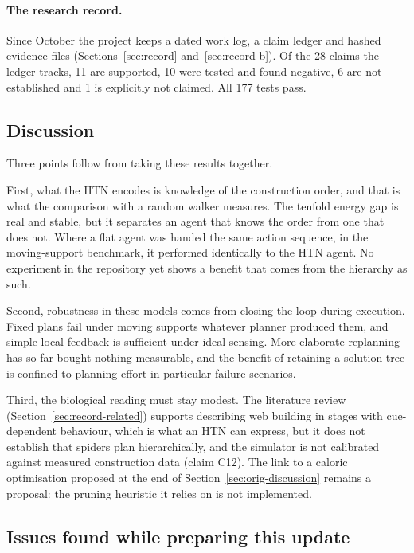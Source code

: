 \paragraph{The research record.}
Since October the project keeps a dated work log, a claim ledger and hashed evidence files
(Sections~\ref{sec:record} and~\ref{sec:record-b}). Of the 28 claims the ledger tracks, 11 are supported, 10
were tested and found negative, 6 are not established and 1 is explicitly not claimed. All 177 tests pass.

\subsection{Discussion}
\label{sec:synthesis-discussion}

Three points follow from taking these results together.

First, what the HTN encodes is knowledge of the construction order, and that is what the comparison with a
random walker measures. The tenfold energy gap is real and stable, but it separates an agent that knows the
order from one that does not. Where a flat agent was handed the same action sequence, in the moving-support
benchmark, it performed identically to the HTN agent. No experiment in the repository yet shows a benefit
that comes from the hierarchy as such.

Second, robustness in these models comes from closing the loop during execution. Fixed plans fail under
moving supports whatever planner produced them, and simple local feedback is sufficient under ideal sensing.
More elaborate replanning has so far bought nothing measurable, and the benefit of retaining a solution tree
is confined to planning effort in particular failure scenarios.

Third, the biological reading must stay modest. The literature review (Section~\ref{sec:record-related})
supports describing web building in stages with cue-dependent behaviour, which is what an HTN can express,
but it does not establish that spiders plan hierarchically, and the simulator is not calibrated against
measured construction data (claim C12). The link to a caloric optimisation proposed at the end of
Section~\ref{sec:orig-discussion} remains a proposal: the pruning heuristic it relies on is not implemented.

\subsection{Issues found while preparing this update}
\label{sec:synthesis-issues}

